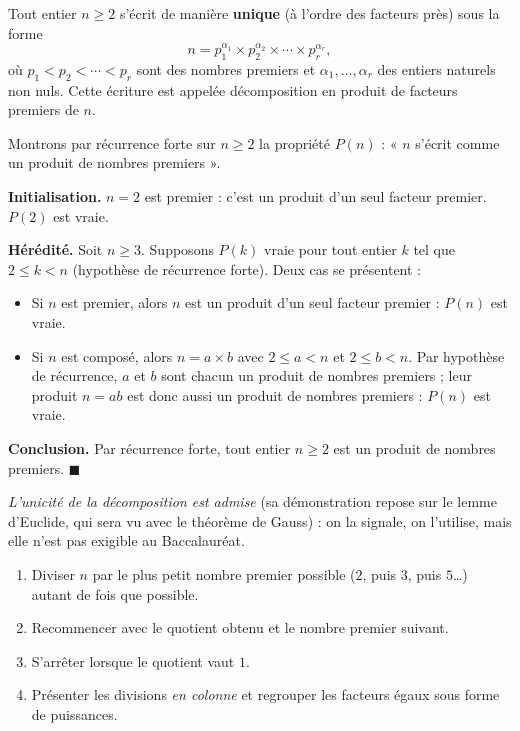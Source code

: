 \documentclass[11pt]{article}
\newcommand{\cle}[1]{{\popxbold\color{popdark}#1}}
\begin{document}
\begin{propriete}
Tout entier $n \geq 2$ s'écrit de manière \textbf{unique} (à l'ordre des facteurs près) sous la forme
\[
n = p_1^{\alpha_1} \times p_2^{\alpha_2} \times \cdots \times p_r^{\alpha_r},
\]
où $p_1 < p_2 < \cdots < p_r$ sont des nombres premiers et $\alpha_1, \dots, \alpha_r$ des entiers naturels non nuls. Cette écriture est appelée \cle{décomposition en produit de facteurs premiers} de $n$.
\end{propriete}

\begin{experience}
Montrons par récurrence forte sur $n \geq 2$ la propriété $P(n)$ : « $n$ s'écrit comme un produit de nombres premiers ».

\textbf{Initialisation.} $n = 2$ est premier : c'est un produit d'un seul facteur premier. $P(2)$ est vraie.

\textbf{Hérédité.} Soit $n \geq 3$. Supposons $P(k)$ vraie pour tout entier $k$ tel que $2 \leq k < n$ (hypothèse de récurrence forte). Deux cas se présentent :
\begin{itemize}
\item Si $n$ est premier, alors $n$ est un produit d'un seul facteur premier : $P(n)$ est vraie.
\item Si $n$ est composé, alors $n = a \times b$ avec $2 \leq a < n$ et $2 \leq b < n$. Par hypothèse de récurrence, $a$ et $b$ sont chacun un produit de nombres premiers ; leur produit $n = ab$ est donc aussi un produit de nombres premiers : $P(n)$ est vraie.
\end{itemize}
\textbf{Conclusion.} Par récurrence forte, tout entier $n \geq 2$ est un produit de nombres premiers. \hfill$\blacksquare$

\emph{L'unicité de la décomposition est admise} (sa démonstration repose sur le lemme d'Euclide, qui sera vu avec le théorème de Gauss) : on la signale, on l'utilise, mais elle n'est pas exigible au Baccalauréat.
\end{experience}

\begin{methode}
\begin{enumerate}
\item Diviser $n$ par le plus petit nombre premier possible ($2$, puis $3$, puis $5$\dots) autant de fois que possible.
\item Recommencer avec le quotient obtenu et le nombre premier suivant.
\item S'arrêter lorsque le quotient vaut $1$.
\item Présenter les divisions \emph{en colonne} et regrouper les facteurs égaux sous forme de puissances.
\end{enumerate}
\end{methode}
\end{document}
